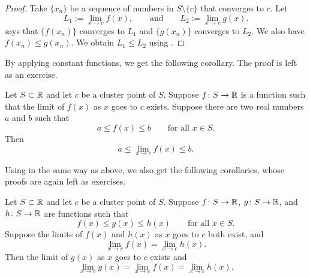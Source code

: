 \begin{proof}
Take $\{ x_n \}$ be a sequence of numbers in $S \setminus \{ c \}$
that converges to $c$.  Let
\begin{equation*}
L_1 := \lim_{x\to c} f(x), \qquad \text{and} \qquad L_2 := \lim_{x\to c} g(x) .
\end{equation*}
 says that $\{ f(x_n) \}$ converges to
$L_1$ and $\{ g(x_n) \}$ converges to $L_2$.  We also
have $f(x_n) \leq g(x_n)$.
We obtain $L_1 \leq L_2$ using
.
\end{proof}

By applying constant functions, we get the following corollary.  The
proof is left as an exercise.

\begin{cor} \label{fconstineq:cor}
Let $S \subset {\mathbb{R}}$ and let $c$ be a cluster point of $S$.  Suppose $f \colon S \to
{\mathbb{R}}$ is a function such that the limit of $f(x)$ as $x$ goes to $c$
exists.
Suppose there are two real numbers $a$ and $b$ such that
\begin{equation*}
a \leq f(x) \leq b \qquad \text{for all } x \in S.
\end{equation*}
Then
\begin{equation*}
a \leq \lim_{x\to c} f(x) \leq b .
\end{equation*}
\end{cor}

Using  in the same way as above, we also get
the following corollaries, whose proofs are again left as exercises.

\begin{cor} \label{fsqueeze:cor}
Let $S \subset {\mathbb{R}}$ and let $c$ be a cluster point of $S$.
Suppose $f \colon S \to {\mathbb{R}}$,
$g \colon S \to {\mathbb{R}}$, and $h \colon S \to {\mathbb{R}}$ are functions such that
\begin{equation*}
f(x) \leq g(x) \leq h(x) \qquad \text{for all } x \in S.
\end{equation*}
Suppose the limits of $f(x)$ and $h(x)$ as $x$ goes to $c$ both exist, and
\begin{equation*}
\lim_{x\to c} f(x) = \lim_{x\to c} h(x) .
\end{equation*}
Then the limit of $g(x)$ as $x$ goes to $c$ exists and
\begin{equation*}
\lim_{x\to c} g(x) =
\lim_{x\to c} f(x) = \lim_{x\to c} h(x) .
\end{equation*}
\end{cor}

